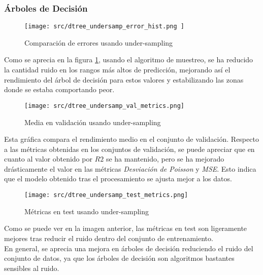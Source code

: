 \subsubsection*{Árboles de Decisión}
\begin{figure}[H]
	\centering
	\texttt{[image: src/dtree\_undersamp\_error\_hist.png ]}
	\caption{Comparación de errores usando under-sampling}
	\label{fig:cmp_error_dtree}
\end{figure}
Como se aprecia en la figura \ref{fig:cmp_error_dtree}, usando el algoritmo de muestreo, se ha reducido la cantidad ruido en los rangos más altos de predicción, mejorando así el rendimiento del árbol de decisión para estos valores y estabilizando las zonas donde se estaba comportando peor.
\begin{figure}[H]
	\centering
	\texttt{[image: src/dtree\_undersamp\_val\_metrics.png]}
	\caption{Media en validación usando under-sampling}
	\label{fig:cmp_val_dtree}
\end{figure}
Esta gráfica compara el rendimiento medio en el conjunto de validación.
Respecto a las métricas obtenidas en los conjuntos de validación, se puede apreciar que en cuanto al valor obtenido por $R2$ se ha mantenido, pero se ha mejorado drásticamente el valor en las métricas \textit{Desviación de Poisson} y \textit{MSE}. Esto indica que el modelo obtenido tras el procesamiento se ajusta mejor a los datos.
\begin{figure}[H]
	\centering
	\texttt{[image: src/dtree\_undersamp\_test\_metrics.png]}
	\caption{Métricas en test usando under-sampling}
	\label{fig:cmp_test_dtree}
\end{figure}
Como se puede ver en la imagen anterior, las métricas en test son ligeramente mejores tras reducir el ruido dentro del conjunto de entrenamiento.\\
\linebreak
En general, se aprecia una mejora en árboles de decisión reduciendo el ruido del conjunto de datos, ya que los árboles de decisión son algoritmos bastantes sensibles al ruido.
